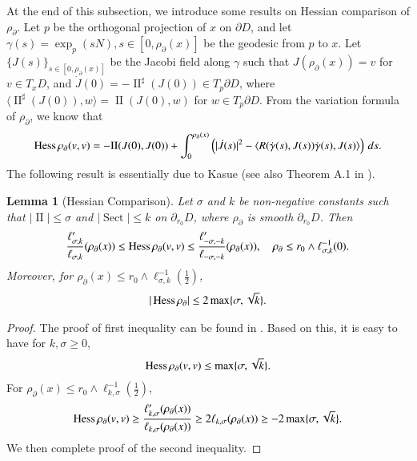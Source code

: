 \documentclass[11pt,reqno]{amsart}
\newtheorem{lemma}[theorem]{Lemma}
\theoremstyle{definition} \newtheorem{remark}[theorem]{Remark}
\numberwithin{equation}{section}
\def\Sect{{\operatorname{Sect}}}
\newcommand\1{\mathbbm{1}}
\def\r{\right}
\def\l{\left} \def\e{\operatorname{e}} \def\dsum{\displaystyle\sum}
\def\II{{\operatorname{II}}}
\begin{document}
At the end of this subsection, we introduce some results on  Hessian comparison of $\rho_{\partial}$. 
Let $p$ be the orthogonal projection of $x$ on $\partial D$, and 
let $\gamma (s)=\exp_p(sN), s\in [0,\rho_{\partial} (x)]$ be the geodesic 
from $p$ to $x$. Let $\{J(s)\}_{s\in [0,\rho_{\partial}(x)]}$ be the Jacobi
field along $\gamma$ such that $J(\rho_{\partial}(x))=v$ for $v\in T_{x}D$, and
$\dot{J}(0)=-\II^{\sharp}(J(0))\in T_p\partial D$, where 
$\langle \II ^{\sharp}(J(0)), w\rangle= \II(J(0), w)$ for $w\in T_p\partial D$. 
From the variation formula of $\rho_{\partial}$, we know that 
  \begin{align}\label{variation-formula}
  \Hess \rho_{\partial} (v,v)=-\II(J(0),J(0))+\int_0^{\rho_\partial(x)}
  \l(|\dot{J}(s)|^2-\langle R(\dot{\gamma}(s), J(s))\dot{\gamma}(s), J(s) \rangle\r)\,ds.
  \end{align}
  The following result is essentially due to Kasue \cite{Kasue82,Kasue84} (see also Theorem A.1 in \cite{Wa05}).
  \begin{lemma}[Hessian Comparison]\label{Hessian Comparison}
  Let $\sigma$ and $k$ be non-negative constants such that $|\II|\leq \sigma$ and $|\Sect|\leq k$ on $\partial_{r_0}D$, where $\rho_{\partial}$ is smooth $\partial_{r_0}D$. Then
  \begin{align*}
 \frac{\ell'_{\sigma, k}}{\ell_{\sigma, k}}(\rho_{\partial}(x)) \leq \operatorname{Hess} {{\rho}_\partial}(v,v)\leq \frac{\ell'_{-\sigma, -k}}{\ell_{-\sigma, -k}}(\rho_{\partial}(x)), \quad  \rho_{\partial}\leq r_0\wedge \ell_{\sigma, k}^{-1}(0).
  \end{align*}
 Moreover, for $\rho_{\partial}(x)\leq r_0\wedge \ell_{\sigma, k}^{-1}(\frac{1}{2})$,
 \begin{align*}
 |\operatorname{Hess} {{\rho}_\partial}|\leq 2\max\{\sigma, \sqrt{k} \} .
 \end{align*} 
  \end{lemma}
\begin{proof}
The proof of  first inequality can be found in \cite[Theorem 1.2.2]{Wbook2}. Based on this, 
it is easy to have for $k,\sigma\geq 0$, 
\begin{align*}
\operatorname{Hess} \rho_{\partial}(v,v)\leq  \max \{\sigma, \sqrt{k}\}.
\end{align*}
For $\rho_{\partial}(x)\leq r_0\wedge \ell_{k,\sigma}^{-1}(\frac{1}{2})$,
\begin{align*}
\operatorname{Hess} \rho_{\partial}(v,v)\geq \frac{\ell'_{k,\sigma}(\rho_{\partial} (x))}{\ell_{k,\sigma}(\rho_{\partial} (x))}\geq 2 \ell_{k,\sigma}(\rho_{\partial} (x))\geq -2\max\{\sigma, \sqrt{k}\}.
\end{align*}
We then complete proof of the second inequality.
\end{proof}
\end{document}
